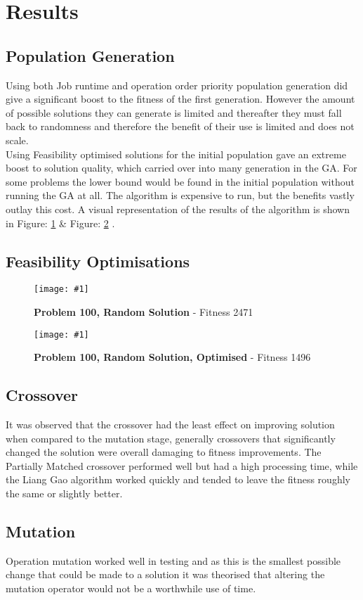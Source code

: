 \documentclass[14pt]{acmsiggraph}
\newcommand{\figuremacroW}[4]{
	\begin{figure}[h] %
		\centering
		\texttt{[image: \#1]}
		\caption[#2]{\textbf{#2} - #3}
		\label{fig:#1}
	\end{figure}
}
\begin{document}
	\section{Results}
	\subsection{Population Generation}
		Using both Job runtime and operation order priority population generation did give a significant boost to the fitness of the first generation. However the amount of possible solutions they can generate is limited and thereafter they must fall back to randomness and therefore the benefit of their use is limited and does not scale.\\
		Using Feasibility optimised solutions for the initial population gave an extreme boost to solution quality, which carried over into many generation in the GA. For some problems the lower bound would be found in the initial population without running the GA at all. The algorithm is expensive to run, but the benefits vastly outlay this cost. A visual representation of the results of the algorithm is shown in Figure: \ref{fig:p100rnd} \& Figure: \ref{fig:p100rndopt} .
	
	\subsection{Feasibility Optimisations}
	\figuremacroW
	{p100rnd}
	{Problem 100, Random Solution}
	{Fitness 2471}
	{1.0}
	\figuremacroW
	{p100rndopt}
	{Problem 100, Random Solution, Optimised}
	{Fitness 1496}
	{1.0}
	
	\subsection{Crossover}
	It was observed that the crossover had the least effect on improving solution when compared to the mutation stage, generally crossovers that significantly changed the solution were overall damaging to fitness improvements. The Partially Matched crossover performed well but had a high processing time, while the Liang Gao algorithm worked quickly and tended to leave the fitness roughly the same or slightly better.
	
	\subsection{Mutation}
	Operation mutation worked well in testing and as this is the smallest possible change that could be made to a solution it was theorised that altering the mutation operator would not be a worthwhile use of time.
	
\end{document}
